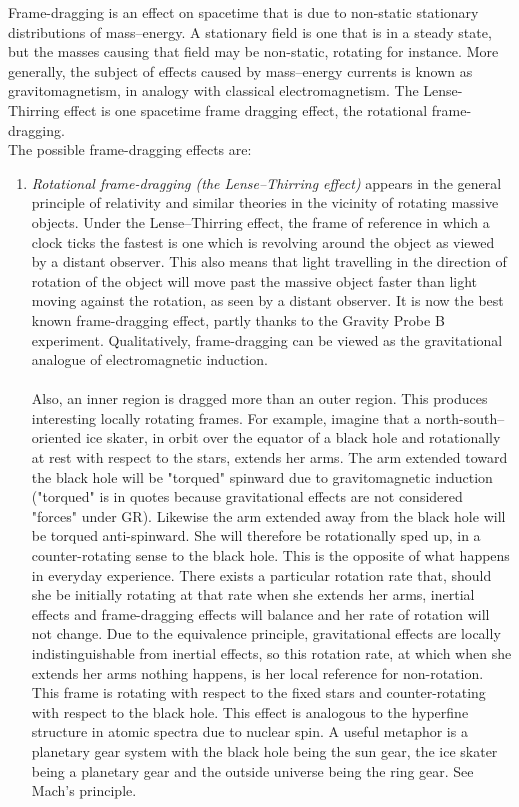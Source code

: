 Frame-dragging is an effect on spacetime that is due to non-static stationary distributions of mass–energy. A stationary field is one that is in a steady state, but the masses causing that field may be non-static, rotating for instance. More generally, the subject of effects caused by mass–energy currents is known as gravitomagnetism, in analogy with classical electromagnetism. The Lense-Thirring effect is one spacetime frame dragging effect, the rotational frame-dragging.
\\
The possible frame-dragging effects are:\\
\begin{enumerate}
	\item \emph{Rotational frame-dragging (the Lense–Thirring effect)} appears in the general principle of relativity and similar theories in the vicinity of rotating massive objects. 
	Under the Lense–Thirring effect, the frame of reference in which a clock ticks the fastest is one which is revolving around the object as viewed by a distant observer. This also means that light travelling in the direction of rotation of the object will move past the massive object faster than light moving against the rotation, as seen by a distant observer. It is now the best known frame-dragging effect, partly thanks to the Gravity Probe B experiment. Qualitatively, frame-dragging can be viewed as the gravitational analogue of electromagnetic induction.\\
	\\	
	Also, an inner region is dragged more than an outer region. This produces interesting locally rotating frames. For example, imagine that a north-south–oriented ice skater, in orbit over the equator of a black hole and rotationally at rest with respect to the stars, extends her arms. The arm extended toward the black hole will be "torqued" spinward due to gravitomagnetic induction ("torqued" is in quotes because gravitational effects are not considered "forces" under GR). Likewise the arm extended away from the black hole will be torqued anti-spinward. She will therefore be rotationally sped up, in a counter-rotating sense to the black hole. This is the opposite of what happens in everyday experience. There exists a particular rotation rate that, should she be initially rotating at that rate when she extends her arms, inertial effects and frame-dragging effects will balance and her rate of rotation will not change. Due to the equivalence principle, gravitational effects are locally indistinguishable from inertial effects, so this rotation rate, at which when she extends her arms nothing happens, is her local reference for non-rotation. This frame is rotating with respect to the fixed stars and counter-rotating with respect to the black hole. This effect is analogous to the hyperfine structure in atomic spectra due to nuclear spin. A useful metaphor is a planetary gear system with the black hole being the sun gear, the ice skater being a planetary gear and the outside universe being the ring gear. See Mach's principle.\\

\end{enumerate}
